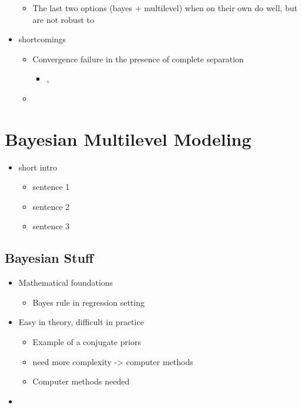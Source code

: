 \documentclass[
]{article}
\providecommand{\tightlist}{%
  \setlength{\itemsep}{0pt}\setlength{\parskip}{0pt}}
\begin{document}
\begin{itemize}
  \begin{itemize}
  \tightlist
  \item
    The last two options (bayes + multilevel) when on their own do well, but are not robust to
  \end{itemize}
\item
  shortcomings

  \begin{itemize}
  \item
    Convergence failure in the presence of complete separation

    \begin{itemize}
    \tightlist
    \item
      \citep{prins2019too}, \citep{ghosh2018use}
    \end{itemize}
  \item
  \end{itemize}
\end{itemize}

\hypertarget{bayesian-modeling}{%
\section{Bayesian Multilevel Modeling}\label{bayesian-modeling}}

\begin{itemize}
\tightlist
\item
  short intro

  \begin{itemize}
  \tightlist
  \item
    sentence 1
  \item
    sentence 2
  \item
    sentence 3
  \end{itemize}
\end{itemize}

\hypertarget{bayesian-stuff}{%
\subsection{Bayesian Stuff}\label{bayesian-stuff}}

\begin{itemize}
\item
  Mathematical foundations

  \begin{itemize}
  \tightlist
  \item
    Bayes rule in regression setting
  \end{itemize}
\item
  Easy in theory, difficult in practice

  \begin{itemize}
  \tightlist
  \item
    Example of a conjugate priors
  \item
    need more complexity -\textgreater{} computer methods
  \item
    Computer methods needed
  \end{itemize}
\item
\end{itemize}
\end{document}
